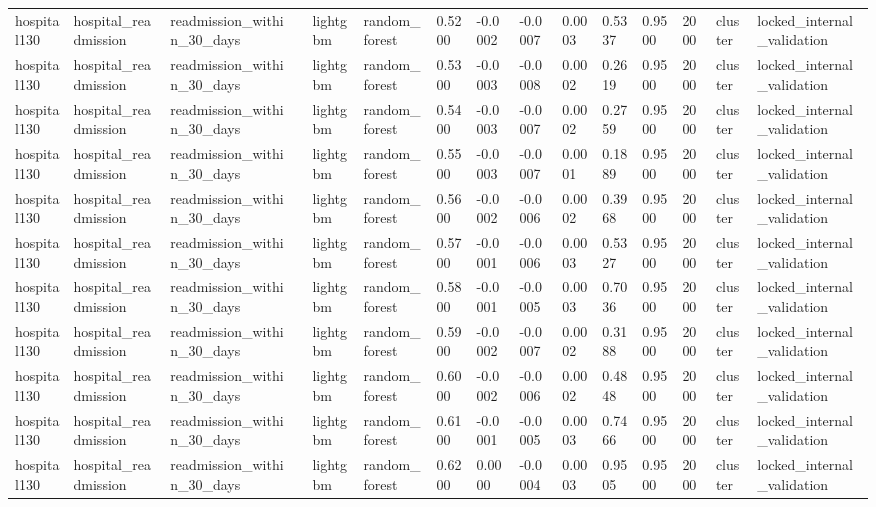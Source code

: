 \begin{tabular}{lllllllllllllll}
hospital130 & hospital\_readmission & readmission\_within\_30\_days &  & lightgbm & random\_forest & 0.5200 & -0.0002 & -0.0007 & 0.0003 & 0.5337 & 0.9500 & 2000 & cluster & locked\_internal\_validation \\
hospital130 & hospital\_readmission & readmission\_within\_30\_days &  & lightgbm & random\_forest & 0.5300 & -0.0003 & -0.0008 & 0.0002 & 0.2619 & 0.9500 & 2000 & cluster & locked\_internal\_validation \\
hospital130 & hospital\_readmission & readmission\_within\_30\_days &  & lightgbm & random\_forest & 0.5400 & -0.0003 & -0.0007 & 0.0002 & 0.2759 & 0.9500 & 2000 & cluster & locked\_internal\_validation \\
hospital130 & hospital\_readmission & readmission\_within\_30\_days &  & lightgbm & random\_forest & 0.5500 & -0.0003 & -0.0007 & 0.0001 & 0.1889 & 0.9500 & 2000 & cluster & locked\_internal\_validation \\
hospital130 & hospital\_readmission & readmission\_within\_30\_days &  & lightgbm & random\_forest & 0.5600 & -0.0002 & -0.0006 & 0.0002 & 0.3968 & 0.9500 & 2000 & cluster & locked\_internal\_validation \\
hospital130 & hospital\_readmission & readmission\_within\_30\_days &  & lightgbm & random\_forest & 0.5700 & -0.0001 & -0.0006 & 0.0003 & 0.5327 & 0.9500 & 2000 & cluster & locked\_internal\_validation \\
hospital130 & hospital\_readmission & readmission\_within\_30\_days &  & lightgbm & random\_forest & 0.5800 & -0.0001 & -0.0005 & 0.0003 & 0.7036 & 0.9500 & 2000 & cluster & locked\_internal\_validation \\
hospital130 & hospital\_readmission & readmission\_within\_30\_days &  & lightgbm & random\_forest & 0.5900 & -0.0002 & -0.0007 & 0.0002 & 0.3188 & 0.9500 & 2000 & cluster & locked\_internal\_validation \\
hospital130 & hospital\_readmission & readmission\_within\_30\_days &  & lightgbm & random\_forest & 0.6000 & -0.0002 & -0.0006 & 0.0002 & 0.4848 & 0.9500 & 2000 & cluster & locked\_internal\_validation \\
hospital130 & hospital\_readmission & readmission\_within\_30\_days &  & lightgbm & random\_forest & 0.6100 & -0.0001 & -0.0005 & 0.0003 & 0.7466 & 0.9500 & 2000 & cluster & locked\_internal\_validation \\
hospital130 & hospital\_readmission & readmission\_within\_30\_days &  & lightgbm & random\_forest & 0.6200 & 0.0000 & -0.0004 & 0.0003 & 0.9505 & 0.9500 & 2000 & cluster & locked\_internal\_validation \\

\end{tabular}
